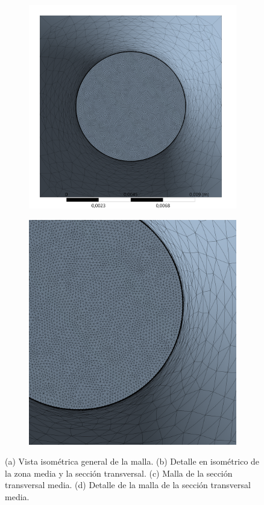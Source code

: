 \begin{figure}[p]
\begin{subfigure}{0.5\linewidth}
		\includegraphics[width=0.9\linewidth]{Imagenes/mcorte.png}
		\caption{}\label{fig:mcorte}
	\end{subfigure}%
		\begin{subfigure}{0.5\linewidth}
		\centering
		\includegraphics[width=0.7\linewidth]{Imagenes/mcorte_det.png}
		\caption{}\label{fig:mcorte_det}
	\end{subfigure}
	\par\bigskip
\caption{(a) Vista isométrica general de la malla. (b) Detalle en isométrico de la zona media y la sección transversal. (c) Malla de la sección transversal media. (d) Detalle de la malla de la sección transversal media.}
\label{fig:malla}
\end{figure}

